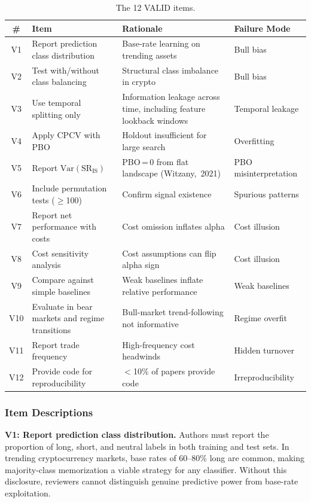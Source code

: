 \documentclass[preprint,12pt,authoryear]{elsarticle}
\begin{document}
\begin{table}[htbp]
\centering
\caption{The 12 VALID items.}
\label{tab:valid}
\footnotesize
\setlength{\tabcolsep}{4pt}
\begin{tabular}{@{}c>{\raggedright\arraybackslash}p{3.4cm}>{\raggedright\arraybackslash}p{5.9cm}>{\raggedright\arraybackslash}p{2.4cm}@{}}
\toprule
\# & Item & Rationale & Failure Mode \\
\midrule
V1 & Report prediction class distribution & Base-rate learning on trending assets & Bull bias \\
V2 & Test with/without class balancing & Structural class imbalance in crypto & Bull bias \\
V3 & Use temporal splitting only & Information leakage across time, including feature lookback windows & Temporal leakage \\
V4 & Apply CPCV with PBO & Holdout insufficient for large search & Overfitting \\
V5 & Report $\mathrm{Var}(\mathrm{SR}_{\mathrm{IS}})$ & PBO\,=\,0 from flat landscape \mbox{(Witzany, 2021)} & PBO misinterpretation \\
V6 & Include permutation tests ($\geq$100) & Confirm signal existence & Spurious patterns \\
V7 & Report net performance with costs & Cost omission inflates alpha & Cost illusion \\
V8 & Cost sensitivity analysis & Cost assumptions can flip alpha sign & Cost illusion \\
V9 & Compare against simple baselines & Weak baselines inflate relative performance & Weak baselines \\
V10 & Evaluate in bear markets and regime transitions & Bull-market trend-following not informative & Regime overfit \\
V11 & Report trade frequency & High-frequency cost headwinds & Hidden turnover \\
V12 & Provide code for reproducibility & $<$10\% of papers provide code & Irrepro\-ducibility \\
\bottomrule
\end{tabular}
\end{table}

\subsubsection{Item Descriptions}

\textbf{V1: Report prediction class distribution.}
Authors must report the proportion of long, short, and neutral labels in both training and test sets. In trending cryptocurrency markets, base rates of 60--80\% long are common, making majority-class memorization a viable strategy for any classifier. Without this disclosure, reviewers cannot distinguish genuine predictive power from base-rate exploitation.
\end{document}
